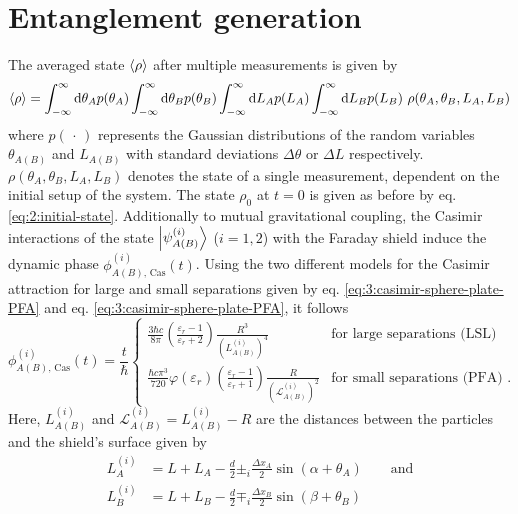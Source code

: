 \section{Entanglement generation}\label{sec:4:entanglement-generation}
The averaged state $\left\langle\rho\right\rangle$ after multiple measurements is given by
\begin{equation}\label{eq:4:average-density}
  \left\langle\rho\right\rangle = \int_{-\infty}^{\infty} \dd \theta_A p(\theta_A) \int_{-\infty}^{\infty} \dd \theta_B p(\theta_B) \int_{-\infty}^{\infty} \dd L_A p(L_A) \int_{-\infty}^{\infty} \dd L_B p(L_B) \ \rho(\theta_A, \theta_B, L_A, L_B)
\end{equation} 
where $p(\,\cdot\,)$ represents the Gaussian distributions of the random variables 
$\theta_{A(B)}$ and $L_{A(B)}$ with standard deviations $\Delta \theta$ or $\Delta L$ respectively. 
$\rho(\theta_A, \theta_B, L_A, L_B)$ denotes the state of a single measurement, dependent on the initial setup of the system.
The state $\rho_0$ at $t=0$ is given as before by eq. \eqref{eq:2:initial-state}.
Additionally to mutual gravitational coupling, the Casimir interactions of the state $\ket{\psi^{(i)}_{A(B)}}$ ($i = 1, 2$) with the Faraday shield induce the dynamic phase $\phi^{(i)}_{A(B),\,\mathrm{Cas}}(t)$.
Using the two different models for the Casimir attraction for large and small separations given by eq. \eqref{eq:3:casimir-sphere-plate-PFA} and eq. \eqref{eq:3:casimir-sphere-plate-PFA}, it follows
\begin{equation}
  \phi^{(i)}_{A(B),\,\mathrm{Cas}}(t) = \frac{t}{\hbar}
  \begin{cases}
     \frac{3 \hbar c}{8 \pi} \left(\frac{\varepsilon_r - 1}{\varepsilon_r + 2}\right) \frac{R^3}{\left(L^{(i)}_{A(B)}\right)^4} & \text{for large separations (LSL)} \\
    \frac{\hbar c \pi^3}{720} \varphi(\varepsilon_r) \left(\frac{\varepsilon_r - 1}{\varepsilon_r + 1}\right) \frac{R}{\left(\mathscr{L}^{(i)}_{A(B)}\right)^2} & \text{for small separations (PFA) .}
  \end{cases}
\end{equation}
Here, $L^{(i)}_{A(B)}$ and $\mathscr{L}^{(i)}_{A(B)} = L^{(i)}_{A(B)}-R$ are the  distances between the particles and the shield's surface given by
\begin{align}\label{eq:4:L-casimir}
  L^{(i)}_{A} &= L + L_{A} - \frac{d}{2} \pm_i \frac{\Delta x_{A}}{2} \sin(\alpha + \theta_{A}) \quad \quad \text{and} \\
  L^{(i)}_{B} &= L + L_{B} - \frac{d}{2} \mp_i \frac{\Delta x_{B}}{2} \sin(\beta + \theta_{B})
\end{align}
